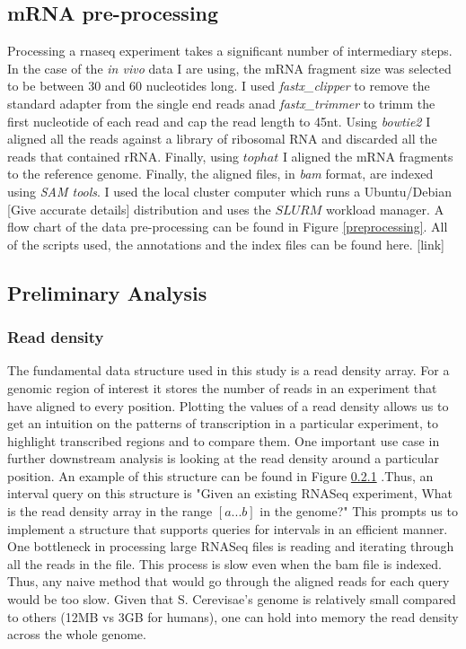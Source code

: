 \documentclass[12pt]{article}
\begin{document}
\subsection{mRNA pre-processing}
Processing a \acrshort{rnaseq} experiment takes a significant number of intermediary steps. In the case of the \textit{in vivo} data I are using, the mRNA fragment size was selected to be between 30 and 60 nucleotides long. I used \textit{fastx\_clipper} to remove the standard adapter from the single end reads anad \textit{fastx\_trimmer}  to trimm the first nucleotide of each read and cap the read length to 45nt. Using \textit{bowtie2} I aligned all the reads against a library of ribosomal RNA and discarded all the reads that  contained rRNA. Finally, using $tophat$ I aligned the mRNA fragments to the reference genome. Finally, the aligned files, in \textit{bam} format, are indexed using \textit{SAM tools}. I used the local cluster computer which runs a Ubuntu/Debian [Give accurate details] distribution and uses the $SLURM$ workload manager. A flow chart of the data pre-processing can be found in Figure \ref{preprocessing}. All of the scripts used, the annotations and the index files can be found here. [link]




\subsection{Preliminary Analysis}
\subsubsection{Read density}\label{density}
The fundamental data structure used in this study is a read density array. For a genomic region of interest it stores the number of reads in an experiment that have aligned to every position. Plotting the values of a read density allows us to get an intuition on the patterns of transcription in a particular experiment, to highlight transcribed regions and to compare them. One important use case in further downstream analysis is looking at the read density around a particular position. An example of this structure can be found in Figure \ref{density} .Thus, an interval query on this structure is "Given an existing RNASeq experiment, What is the read density array in the range $[a...b]$ in the genome?" 
This prompts us to implement a structure that supports queries for intervals in an efficient manner. One bottleneck in processing large RNASeq files is reading and iterating through all the reads in the file. This process is slow even when the bam file is indexed. Thus, any naive method that would go through the aligned reads for each query would be too slow. Given that S. Cerevisae's genome is relatively small compared to others (12MB vs 3GB for humans), one can hold into memory the read density across the whole genome.
\end{document}
